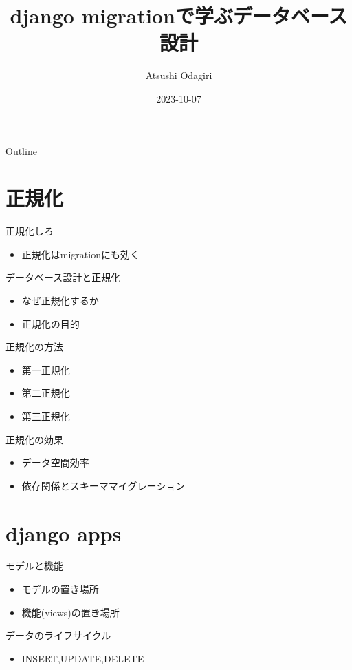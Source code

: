 \documentclass[presentation]{beamer}
\author{Atsushi Odagiri}
\date{2023-10-07}
\title{django migrationで学ぶデータベース設計}
\begin{document}
\maketitle
\begin{frame}{Outline}
\tableofcontents
\end{frame}


\section{正規化}
\label{sec:org155ef6d}
\begin{frame}[label={sec:org7297f08}]{正規化しろ}
\begin{itemize}
\item 正規化はmigrationにも効く
\end{itemize}
\end{frame}
\begin{frame}[label={sec:orgb54e629}]{データベース設計と正規化}
\begin{itemize}
\item なぜ正規化するか
\item 正規化の目的
\end{itemize}
\end{frame}
\begin{frame}[label={sec:org4a61853}]{正規化の方法}
\begin{itemize}
\item 第一正規化
\item 第二正規化
\item 第三正規化
\end{itemize}
\end{frame}
\begin{frame}[label={sec:org3cecd87}]{正規化の効果}
\begin{itemize}
\item データ空間効率
\item 依存関係とスキーママイグレーション
\end{itemize}
\end{frame}
\section{django apps}
\label{sec:org593f997}
\begin{frame}[label={sec:orge28a8d4}]{モデルと機能}
\begin{itemize}
\item モデルの置き場所
\item 機能(views)の置き場所
\end{itemize}
\end{frame}
\begin{frame}[label={sec:org75ea683}]{データのライフサイクル}
\begin{itemize}
\item INSERT,UPDATE,DELETE
\end{itemize}
\end{frame}
\end{document}
